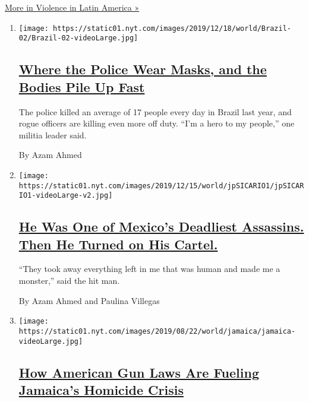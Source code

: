 \href{/spotlight/violence-in-latin-america}{More in Violence in Latin
America »}

\begin{enumerate}
\def\labelenumi{\arabic{enumi}.}
\item
  \texttt{[image: https://static01.nyt.com/images/2019/12/18/world/Brazil-02/Brazil-02-videoLarge.jpg]}

  \hypertarget{where-the-police-wear-masks-and-the-bodies-pile-up-fast}{%
  \subsection{\texorpdfstring{\href{/2019/12/20/world/americas/brazil-police-shootings-murder.html}{Where
  the Police Wear Masks, and the Bodies Pile Up
  Fast}}{Where the Police Wear Masks, and the Bodies Pile Up Fast}}\label{where-the-police-wear-masks-and-the-bodies-pile-up-fast}}

  The police killed an average of 17 people every day in Brazil last
  year, and rogue officers are killing even more off duty. ``I'm a hero
  to my people,'' one militia leader said.

  By Azam Ahmed
\item
  \texttt{[image: https://static01.nyt.com/images/2019/12/15/world/jpSICARIO1/jpSICARIO1-videoLarge-v2.jpg]}

  \hypertarget{he-was-one-of-mexicos-deadliest-assassins-then-he-turned-on-his-cartel}{%
  \subsection{\texorpdfstring{\href{/2019/12/14/world/americas/sicario-mexico-drug-cartels.html}{He
  Was One of Mexico's Deadliest Assassins. Then He Turned on His
  Cartel.}}{He Was One of Mexico's Deadliest Assassins. Then He Turned on His Cartel.}}\label{he-was-one-of-mexicos-deadliest-assassins-then-he-turned-on-his-cartel}}

  ``They took away everything left in me that was human and made me a
  monster,'' said the hit man.

  By Azam Ahmed and Paulina Villegas
\item
  \texttt{[image: https://static01.nyt.com/images/2019/08/22/world/jamaica/jamaica-videoLarge.jpg]}

  \hypertarget{how-american-gun-laws-are-fueling-jamaicas-homicide-crisis}{%
  \subsection{\texorpdfstring{\href{/2019/08/25/world/americas/one-handgun-9-murders-how-american-firearms-cause-carnage-abroad.html}{How
  American Gun Laws Are Fueling Jamaica's Homicide
  Crisis}}{How American Gun Laws Are Fueling Jamaica's Homicide Crisis}}\label{how-american-gun-laws-are-fueling-jamaicas-homicide-crisis}}


\end{enumerate}
